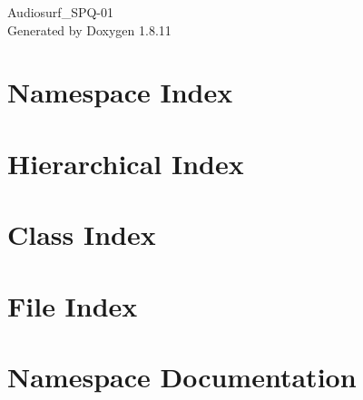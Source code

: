 \documentclass[twoside]{book}
\newcommand{\+}{\discretionary{\mbox{\scriptsize$\hookleftarrow$}}{}{}}
\newcommand{\clearemptydoublepage}{%
  \newpage{\pagestyle{empty}\cleardoublepage}%
}
\begin{document}
\hypersetup{pageanchor=false,
             bookmarksnumbered=true,
             pdfencoding=unicode
            }
\begin{titlepage}
\vspace*{7cm}
\begin{center}%
{\Large Audiosurf\+\_\+\+S\+P\+Q-\/01 }\\
\vspace*{1cm}
{\large Generated by Doxygen 1.8.11}\\
\end{center}
\end{titlepage}
\clearemptydoublepage
\tableofcontents
\clearemptydoublepage
{}
\hypersetup{pageanchor=true}

\chapter{Namespace Index}

\chapter{Hierarchical Index}

\chapter{Class Index}

\chapter{File Index}

\chapter{Namespace Documentation}













\end{document}
